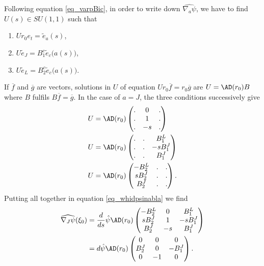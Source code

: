 Following equation \eqref{eq_varpBic}, in order to write down $\widehat{\nabla_a\psi}$, we have to find $U(s)\in SU(1,1)$ such that
\begin{enumerate}
	\item $Ur_0e_t=\tilde{e}_a(s)$,
	\item $U\tilde{e}_J=B^c_1\tilde{e}_c\big( a(s) \big)$,
	\item $U\tilde{e}_L=B^c_2\tilde{e}_c\big( a(s) \big)$.
\end{enumerate}
If $\overline{ f }$ and $\overline{ g }$ are vectors, solutions in $U$ of equation $Ur_0\overline{ f }=r_0\overline{ g }$ are $U=\AD(r_0)B$ where $B$ fulfils $B\overline{ f }=\overline{ g }$. In the case of $a=J$, the three conditions successively give
\begin{subequations}
	\begin{align}
		U & =\AD(r_0)\begin{pmatrix}
			             . & 0  & . \\
			             . & 1  & . \\
			             . & -s & .
		             \end{pmatrix}  \\
		U & =\AD(r_0)\begin{pmatrix}
			             . & . & B_1^L   \\
			             . & . & -sB_1^J \\
			             . & . & B_1^J
		             \end{pmatrix} \\
		U & =\AD(r_0)\begin{pmatrix}
			             -B^L_2 & . & . \\
			             sB_2^J & . & . \\
			             B_2^J  & . & .
		             \end{pmatrix}.
	\end{align}
\end{subequations}
Putting all together in equation \eqref{eq_whidpsinabla} we find
\begin{equation} \label{eq_nabJmoi}
	\begin{split}
		\widehat{\nabla_J\psi}(\xi_0)&=\frac{ d }{ ds }\hat{\psi}\AD(r_0)
		\begin{pmatrix}
			-B_2^L & 0  & B_1^L   \\
			sB_2^J & 1  & -sB_1^J \\
			B_2^J  & -s & B_1^J
		\end{pmatrix}\\
		&=d\hat{\psi}\AD(r_0)\begin{pmatrix}
			0     & 0  & 0      \\
			B_2^J & 0  & -B_1^J \\
			0     & -1 & 0
		\end{pmatrix}.
	\end{split}
\end{equation}
